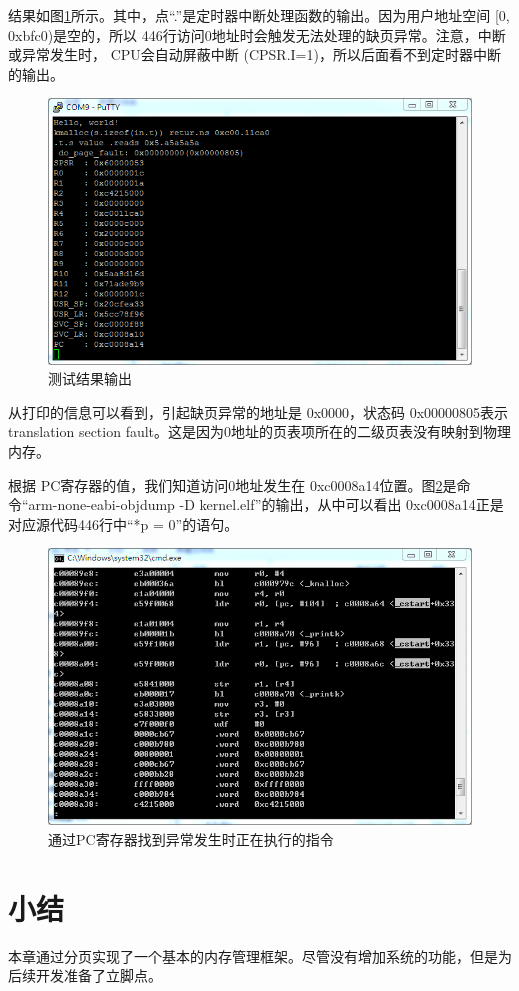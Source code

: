 \documentclass[main.tex]{subfiles}
\begin{document}
\begin{CJK*}{UTF8}{song}
结果如图\ref{figure:4-10}所示。其中，点“.”是定时器中断处理函数的输出。因为用户地址空间 [0, 0xbfc0)是空的，所以 446行访问0地址时会触发无法处理的缺页异常。注意，中断或异常发生时， CPU会自动屏蔽中断 (CPSR.I=1)，所以后面看不到定时器中断的输出。

\begin{figure}[htp]
\centering
\includegraphics[scale=0.5]{figures/4-10}
\caption{测试结果输出}
\label{figure:4-10}
\end{figure}

从打印的信息可以看到，引起缺页异常的地址是 0x0000，状态码 0x0000\-0805表示 translation section fault。这是因为0地址的页表项所在的二级页表没有映射到物理内存。

\par
根据 PC寄存器的值，我们知道访问0地址发生在 0xc000\-8a14位置。图\ref{figure:4-11}是命令“arm-\-none-\-eabi-\-objdump -D kernel.elf”的输出，从中可以看出 0xc000\-8a14正是对应源代码446行中“*p = 0”的语句。

\begin{figure}[htp]
\centering
\includegraphics[scale=0.5]{figures/4-11}
\caption{通过PC寄存器找到异常发生时正在执行的指令}
\label{figure:4-11}
\end{figure}

\section{小结}
本章通过分页实现了一个基本的内存管理框架。尽管没有增加系统的功能，但是为后续开发准备了立脚点。

\clearpage
\ifxetex\else\end{CJK*}\fi
\end{document}
